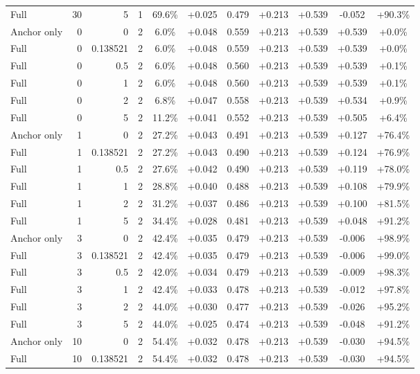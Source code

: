 \begin{table}[htbp]
\begin{tabular}{lrrrccccccc}
Full & 30 & 5 & 1 & 69.6\% & +0.025 & 0.479 & +0.213 & +0.539 & -0.052 & +90.3\% \\
Anchor only & 0 & 0 & 2 & 6.0\% & +0.048 & 0.559 & +0.213 & +0.539 & +0.539 & +0.0\% \\
Full & 0 & 0.138521 & 2 & 6.0\% & +0.048 & 0.559 & +0.213 & +0.539 & +0.539 & +0.0\% \\
Full & 0 & 0.5 & 2 & 6.0\% & +0.048 & 0.560 & +0.213 & +0.539 & +0.539 & +0.1\% \\
Full & 0 & 1 & 2 & 6.0\% & +0.048 & 0.560 & +0.213 & +0.539 & +0.539 & +0.1\% \\
Full & 0 & 2 & 2 & 6.8\% & +0.047 & 0.558 & +0.213 & +0.539 & +0.534 & +0.9\% \\
Full & 0 & 5 & 2 & 11.2\% & +0.041 & 0.552 & +0.213 & +0.539 & +0.505 & +6.4\% \\
Anchor only & 1 & 0 & 2 & 27.2\% & +0.043 & 0.491 & +0.213 & +0.539 & +0.127 & +76.4\% \\
Full & 1 & 0.138521 & 2 & 27.2\% & +0.043 & 0.490 & +0.213 & +0.539 & +0.124 & +76.9\% \\
Full & 1 & 0.5 & 2 & 27.6\% & +0.042 & 0.490 & +0.213 & +0.539 & +0.119 & +78.0\% \\
Full & 1 & 1 & 2 & 28.8\% & +0.040 & 0.488 & +0.213 & +0.539 & +0.108 & +79.9\% \\
Full & 1 & 2 & 2 & 31.2\% & +0.037 & 0.486 & +0.213 & +0.539 & +0.100 & +81.5\% \\
Full & 1 & 5 & 2 & 34.4\% & +0.028 & 0.481 & +0.213 & +0.539 & +0.048 & +91.2\% \\
Anchor only & 3 & 0 & 2 & 42.4\% & +0.035 & 0.479 & +0.213 & +0.539 & -0.006 & +98.9\% \\
Full & 3 & 0.138521 & 2 & 42.4\% & +0.035 & 0.479 & +0.213 & +0.539 & -0.006 & +99.0\% \\
Full & 3 & 0.5 & 2 & 42.0\% & +0.034 & 0.479 & +0.213 & +0.539 & -0.009 & +98.3\% \\
Full & 3 & 1 & 2 & 42.4\% & +0.033 & 0.478 & +0.213 & +0.539 & -0.012 & +97.8\% \\
Full & 3 & 2 & 2 & 44.0\% & +0.030 & 0.477 & +0.213 & +0.539 & -0.026 & +95.2\% \\
Full & 3 & 5 & 2 & 44.0\% & +0.025 & 0.474 & +0.213 & +0.539 & -0.048 & +91.2\% \\
Anchor only & 10 & 0 & 2 & 54.4\% & +0.032 & 0.478 & +0.213 & +0.539 & -0.030 & +94.5\% \\
Full & 10 & 0.138521 & 2 & 54.4\% & +0.032 & 0.478 & +0.213 & +0.539 & -0.030 & +94.5\% \\

\end{tabular}
\end{table}
